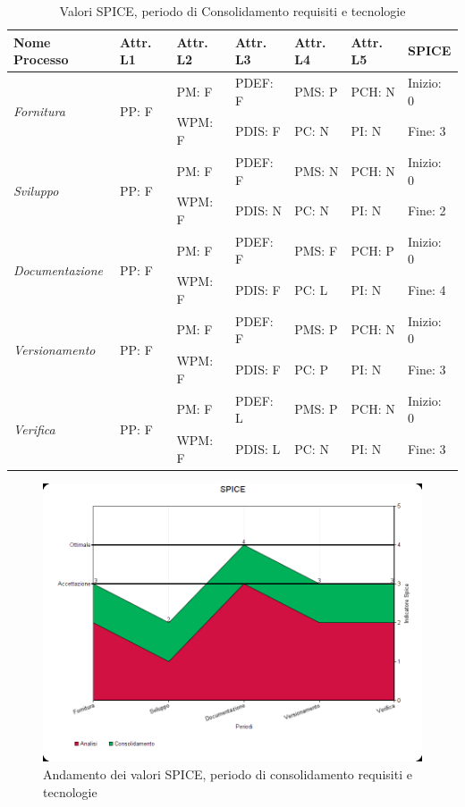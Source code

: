 \documentclass[openany,12pt,a4paper]{report}
\begin{document}
\begin{table}[h]
	\begin{center}
		\setlength\LTleft{-22mm}
		\begin{longtable}{|p{35mm}|p{20mm}|p{20mm}|p{20mm}|p{20mm}|p{20mm}|p{20mm}|}
			\hline
			\textbf{Nome Processo} & \textbf{Attr. L1} & \textbf{Attr. L2} & \textbf{Attr. L3} & \textbf{Attr. L4} & \textbf{Attr. L5} & \textbf{SPICE}\\
			\hline
			\multirow{2}{*}{\textit{Fornitura}} & \multirow{2}{*}{PP: F} & PM: F & PDEF: F & PMS: P & PCH: N & Inizio: 0\\  
			\cline{3-7}
			&          & WPM: F & PDIS: F & PC: N & PI: N & Fine: 3 \\ 
			\hline
			\multirow{2}{*}{\textit{Sviluppo}} & \multirow{2}{*}{PP: F} & PM: F & PDEF: F & PMS: N & PCH: N & Inizio: 0\\  \cline{3-7}
			&          & WPM: F & PDIS: N & PC: N & PI: N & Fine: 2\\
			\hline\multirow{2}{*}{\textit{Documentazione}} & \multirow{2}{*}{PP: F} & PM: F & PDEF: F & PMS: F & PCH: P & Inizio: 0\\  \cline{3-7}
			&          & WPM: F & PDIS: F & PC: L & PI: N & Fine: 4\\ 
			\hline\multirow{2}{*}{\textit{Versionamento}} & \multirow{2}{*}{PP: F} & PM: F & PDEF: F & PMS: P & PCH: N & Inizio: 0\\  \cline{3-7}
			&          & WPM: F & PDIS: F & PC: P & PI: N & Fine: 3\\ 
			\hline\multirow{2}{*}{\textit{Verifica}} & \multirow{2}{*}{PP: F} & PM: F & PDEF: L & PMS: P & PCH: N & Inizio: 0\\  \cline{3-7}
			&          & WPM: F & PDIS: L & PC: N & PI: N & Fine: 3\\ 
			\hline       
		\end{longtable}
	\end{center}
	\caption{Valori SPICE, periodo di Consolidamento requisiti e tecnologie} 
\end{table}

\begin{figure}[H]
	\includegraphics[scale=0.5]{Spice/spice-consolidamento}
	\centering
	\caption{Andamento dei valori SPICE, periodo di consolidamento requisiti e tecnologie}
\end{figure}
\end{document}
